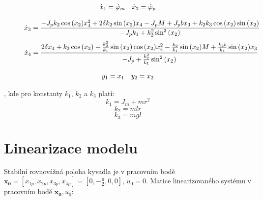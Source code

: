\documentclass[11pt,a4paper]{article}
\begin{document}
\begin{align*}
& \xd{1} = \phid{m}    &&	\xd{2} = \phid{p} \\
\end{align*}
\begin{figure}[H]
\vspace*{-1.3 cm}
$$
\xd{3} =
\frac{
	-J_p k_2 \coss{\x{2}} \x{4}^2 + 2 \delta k_2 \sinn{\x{2}} \x{4} - J_p \M + J_p b \x{3} 	+ k_2 k_3 \coss{\x{2}} \sinn{\x{2}}
}{
 	-J_p k_1 + k_2^2 \sinnN{\x{2}}
}
$$
$$
\xd{4} =
\frac{
	2 \delta \x{4} + k_3 \coss{\x{2}} - \frac{k_2^2}{k_1} \sinn{\x{2}} \coss{\x{2}} 			 	\x{4}^2 - \frac{k_2}{k_1} \sinn{\x{2}} M + \frac{k_2 b}{k_1} \sinn{\x{2}} \x{3}
}{
	-J_p + \frac{k_2^2}{k_1} \sinnN{\x{2}}
}
$$
\end{figure}
\begin{figure}[H]
\vspace*{-1.3 cm}
\begin{align*}
& \y{1} = \x{1}			 &&		\y{2} = \x{2} \\
\end{align*}
\end{figure}

, kde pro konstanty $k_1$, $k_2$ a $k_3$ platí:
$$
k_1 = J_m + m r^2
$$
$$
k_2 = m l r
$$
$$
k_3 = m g l
$$






\section{Linearizace modelu}
Stabilní rovnovážná poloha kyvadla je v pracovním bodě $\mathbf{x_0} = [x_{1p}, x_{2p}, x_{3p}, x_{4p}] = [0, -\frac{\pi}{2}, 0, 0]$, ${u_0} = 0$.
\newline
Matice linearizovaného systému v pracovním bodě $\mathbf{x_0}, u_0$:
\end{document}
